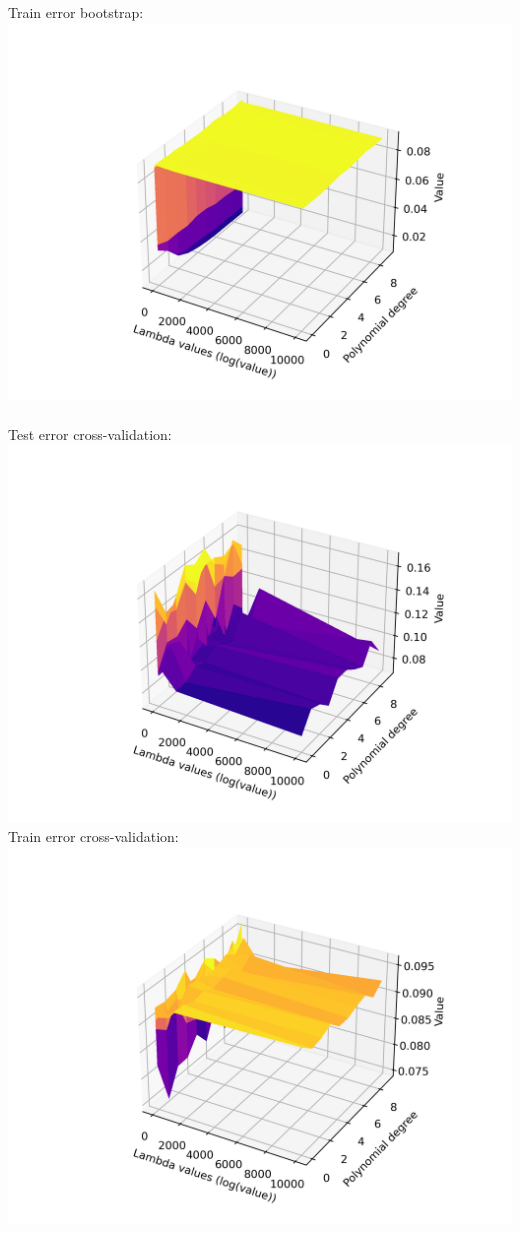 \documentclass[12pt, letterpaper, twoside]{article}
\begin{document}
Train error bootstrap:\\
\includegraphics[scale=0.6]{"ex5_traningerror_bootstrap.png"}\\
\newpage
\ \\
Test error cross-validation:\\
\includegraphics[scale=0.6]{"ex5_testerror_cv.png"}\\
Train error cross-validation:\\
\includegraphics[scale=0.6]{"ex5_traningerror_cv.png"}\\
\end{document}
